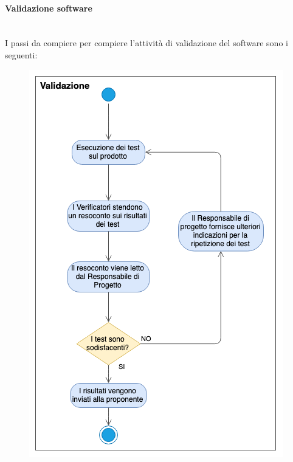 \paragraph{Validazione software} \-\\
I passi da compiere per compiere l'attività di validazione del software sono i seguenti:
\begin{figure}[H]
	\begin{center}
		\includegraphics[scale=0.7]{./images/Validazione.png}
	\end{center}
\end{figure}
